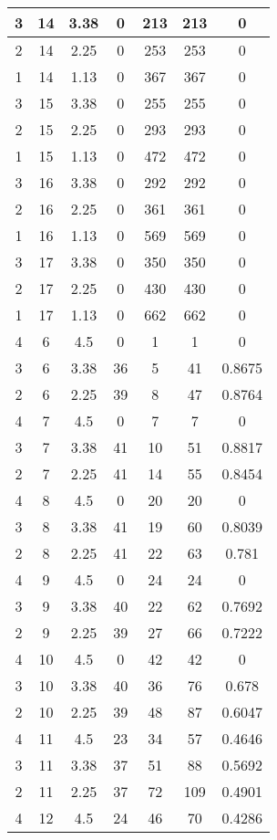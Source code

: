 \documentclass[letterpaper, 12pt]{article}
\begin{document}
\begin{longtable}{|c|c|c|c|c|c|c|}
\hline
3 & 14 & 3.38 & 0 & 213 & 213 & 0 \\
\hline
2 & 14 & 2.25 & 0 & 253 & 253 & 0 \\
\hline
1 & 14 & 1.13 & 0 & 367 & 367 & 0 \\
\hline
3 & 15 & 3.38 & 0 & 255 & 255 & 0 \\
\hline
2 & 15 & 2.25 & 0 & 293 & 293 & 0 \\
\hline
1 & 15 & 1.13 & 0 & 472 & 472 & 0 \\
\hline
3 & 16 & 3.38 & 0 & 292 & 292 & 0 \\
\hline
2 & 16 & 2.25 & 0 & 361 & 361 & 0 \\
\hline
1 & 16 & 1.13 & 0 & 569 & 569 & 0 \\
\hline
3 & 17 & 3.38 & 0 & 350 & 350 & 0 \\
\hline
2 & 17 & 2.25 & 0 & 430 & 430 & 0 \\
\hline
1 & 17 & 1.13 & 0 & 662 & 662 & 0 \\
\hline
4 & 6 & 4.5 & 0 & 1 & 1 & 0 \\
\hline
3 & 6 & 3.38 & 36 & 5 & 41 & 0.8675 \\
\hline
2 & 6 & 2.25 & 39 & 8 & 47 & 0.8764 \\
\hline
4 & 7 & 4.5 & 0 & 7 & 7 & 0 \\
\hline
3 & 7 & 3.38 & 41 & 10 & 51 & 0.8817 \\
\hline
2 & 7 & 2.25 & 41 & 14 & 55 & 0.8454 \\
\hline
4 & 8 & 4.5 & 0 & 20 & 20 & 0 \\
\hline
3 & 8 & 3.38 & 41 & 19 & 60 & 0.8039 \\
\hline
2 & 8 & 2.25 & 41 & 22 & 63 & 0.781 \\
\hline
4 & 9 & 4.5 & 0 & 24 & 24 & 0 \\
\hline
3 & 9 & 3.38 & 40 & 22 & 62 & 0.7692 \\
\hline
2 & 9 & 2.25 & 39 & 27 & 66 & 0.7222 \\
\hline
4 & 10 & 4.5 & 0 & 42 & 42 & 0 \\
\hline
3 & 10 & 3.38 & 40 & 36 & 76 & 0.678 \\
\hline
2 & 10 & 2.25 & 39 & 48 & 87 & 0.6047 \\
\hline
4 & 11 & 4.5 & 23 & 34 & 57 & 0.4646 \\
\hline
3 & 11 & 3.38 & 37 & 51 & 88 & 0.5692 \\
\hline
2 & 11 & 2.25 & 37 & 72 & 109 & 0.4901 \\
\hline
4 & 12 & 4.5 & 24 & 46 & 70 & 0.4286 \\

\end{longtable}
\end{document}
